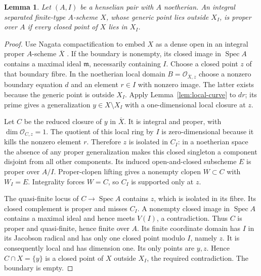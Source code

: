 \documentclass[11pt,a4paper]{article}
\newtheorem{lemma}[theorem]{Lemma}
\theoremstyle{definition}
\newcommand{\Spec}{\operatorname{Spec}}
\begin{document}
\begin{lemma}\label{lem:horizontal-proper}
Let $(A,I)$ be a henselian pair with $A$ noetherian. An integral separated finite-type $A$-scheme $X$, whose generic point lies outside $X_I$, is proper over $A$ if every closed point of $X$ lies in $X_I$.
\end{lemma}
\begin{proof}
Use Nagata compactification to embed $X$ as a dense open in an integral proper $A$-scheme $\overline X$ \cite[Theorem~38.33.8, tag 0F41]{Stacks}. If the boundary is nonempty, its closed image in $\Spec A$ contains a maximal ideal $\mathfrak m$, necessarily containing $I$. Choose a closed point $z$ of that boundary fibre. In the noetherian local domain $B=\mathcal O_{\overline X,z}$ choose a nonzero boundary equation $d$ and an element $r\in I$ with nonzero image. The latter exists because the generic point is outside $X_I$. Apply Lemma~\ref{lem:local-curve} to $dr$; its prime gives a generalization $y\in X\setminus X_I$ with a one-dimensional local closure at $z$.

Let $C$ be the reduced closure of $y$ in $\overline X$. It is integral and proper, with $\dim\mathcal O_{C,z}=1$. The quotient of this local ring by $I$ is zero-dimensional because it kills the nonzero element $r$. Therefore $z$ is isolated in $C_I$: in a noetherian space the absence of any proper generalization makes this closed singleton a component disjoint from all other components. Its induced open-and-closed subscheme $E$ is proper over $A/I$. Proper-clopen lifting gives a nonempty clopen $W\subset C$ with $W_I=E$. Integrality forces $W=C$, so $C_I$ is supported only at $z$.

The quasi-finite locus of $C\to\Spec A$ contains $z$, which is isolated in its fibre. Its closed complement is proper and misses $C_I$. A nonempty closed image in $\Spec A$ contains a maximal ideal and hence meets $V(I)$, a contradiction. Thus $C$ is proper and quasi-finite, hence finite over $A$. Its finite coordinate domain has $I$ in its Jacobson radical and has only one closed point modulo $I$, namely $z$. It is consequently local and has dimension one. Its only points are $y,z$. Hence $C\cap X=\{y\}$ is a closed point of $X$ outside $X_I$, the required contradiction. The boundary is empty.
\end{proof}
\end{document}
